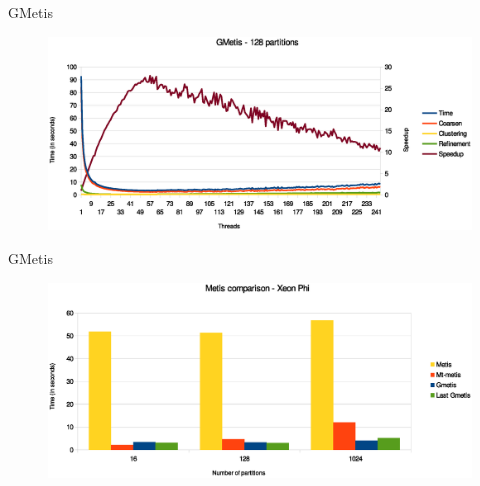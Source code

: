 \documentclass{beamer}
\begin{document}

\begin{frame}
\end{frame}



\begin{frame}{GMetis}
\begin{center}
  \begin{figure}[htbp]
    \includegraphics[scale=.35]{gmetis128.eps}
  \end{figure}
\end{center}
\end{frame}

\begin{frame}{GMetis}
\begin{center}
  \begin{figure}[htbp]
    \includegraphics[scale=.35]{comparison.eps}
  \end{figure}
\end{center}
\end{frame}
\end{document}
